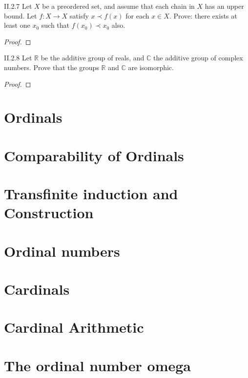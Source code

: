 \begin{problem}{II.2.7}
Let \(X\) be a preordered set, and assume that each chain in \(X\) has an upper bound. Let \(f: X \to X\) satisfy \( x \prec f(x) \) for each \( x \in X \). Prove: there exists at least one \(x_{0}\) such that \( f(x_{0}) \prec x_{0} \) also.
\end{problem}

\begin{proof}
\end{proof}

\begin{problem}{II.2.8}
Let \( \mathbb{R} \) be the additive group of reals, and \( \mathbb{C} \) the additive group of complex numbers. Prove that the groups \( \mathbb{R} \) and \( \mathbb{C} \) are isomorphic.
\end{problem}

\begin{proof}
\end{proof}

\section{Ordinals}

\section{Comparability of Ordinals}

\section{Transfinite induction and Construction}

\section{Ordinal numbers}

\section{Cardinals}

\section{Cardinal Arithmetic}

\section{The ordinal number omega}
